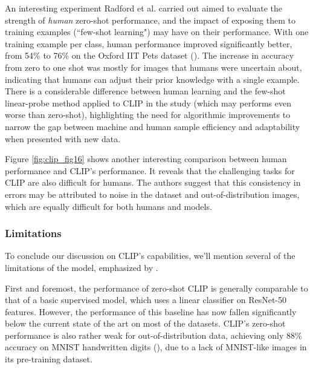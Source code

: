 \documentclass{article}
\begin{document}
\medskip
\noindent
An interesting experiment Radford et al. carried out aimed to evaluate the strength of \emph{human} zero-shot performance, and the impact of exposing them to training examples (``few-shot learning") may have on their performance. With one training example per class, human performance improved significantly better, from 54\% to 76\% on the Oxford IIT Pets dataset (\citet{parkhi2012pets}). The increase in accuracy from zero to one shot was mostly for images that humans were uncertain about, indicating that humans can adjust their prior knowledge with a single example. There is a considerable difference between human learning and the few-shot linear-probe method applied to CLIP in the study (which may performs even worse than zero-shot), highlighting the need for algorithmic improvements to narrow the gap between machine and human sample efficiency and adaptability when presented with new data.

\medskip
\noindent
Figure \ref{fig:clip_fig16} shows another interesting comparison between human performance and CLIP's performance. It reveals that the challenging tasks for CLIP are also difficult for humans. The authors suggest that this consistency in errors may be attributed to noise in the dataset and out-of-distribution images, which are equally difficult for both humans and models.



\subsubsection{Limitations}
\label{subsec:clip-limitations}

To conclude our discussion on CLIP's capabilities, we'll mention several of the limitations of the model, emphasized by \citet{radford2021clip}.

\medskip
\noindent
First and foremost, the performance of zero-shot CLIP is generally comparable to that of a basic supervised model, which uses a linear classifier on ResNet-50 features. However, the performance of this baseline has now fallen significantly below the current state of the art on most of the datasets. CLIP's zero-shot performance is also rather weak for out-of-distribution data, achieving only 88\% accuracy on MNIST handwritten digits (\citet{mnist}), due to a lack of MNIST-like images in its pre-training dataset.
\end{document}
